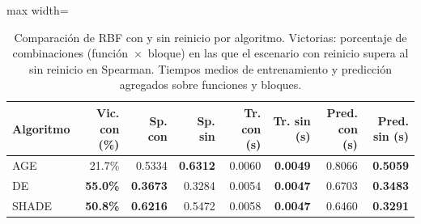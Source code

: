 \begin{table}[H]
    \centering
    \small
    \begin{adjustbox}{max width=\textwidth}
\begin{tabular}{l r r r r r r r}
\toprule
\textbf{Algoritmo} & \textbf{Vic. con (\%)} & \textbf{Sp. con} & \textbf{Sp. sin} & \textbf{Tr. con (s)} & \textbf{Tr. sin (s)} & \textbf{Pred. con (s)} & \textbf{Pred. sin (s)} \\
\midrule
AGE & 21.7\% & 0.5334 & \textbf{0.6312} & 0.0060 & \textbf{0.0049} & 0.8066 & \textbf{0.5059} \\
DE & \textbf{55.0\%} & \textbf{0.3673} & 0.3284 & 0.0054 & \textbf{0.0047} & 0.6703 & \textbf{0.3483} \\
SHADE & \textbf{50.8\%} & \textbf{0.6216} & 0.5472 & 0.0058 & \textbf{0.0047} & 0.6460 & \textbf{0.3291} \\
\bottomrule
\end{tabular}
    \end{adjustbox}
    \caption[Comparación de RBF con y sin reinicio por algoritmo.]{Comparación de RBF con y sin reinicio por algoritmo. Victorias: porcentaje de combinaciones (función~$\times$~bloque) en las que el escenario con reinicio supera al sin reinicio en Spearman. Tiempos medios de entrenamiento y predicción agregados sobre funciones y bloques.}
    \label{tab:comparativa_reinicio_surrogate_v2}
\end{table}